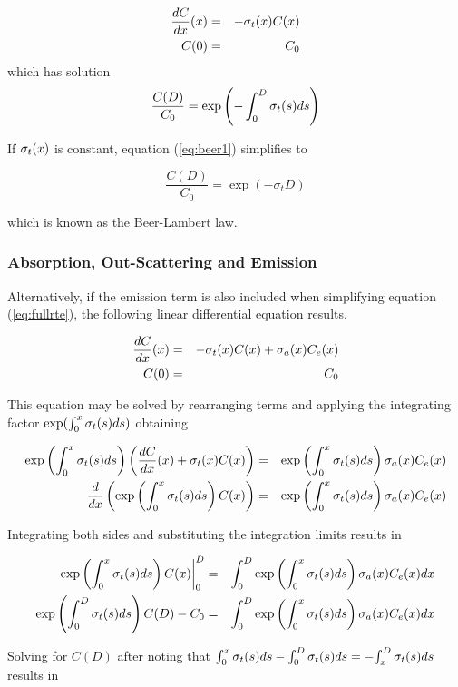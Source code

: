 \begin{eqnarray*}
\frac{dC}{dx}(x)&=&-\sigma_t(x) C(x)\\
C(0)&=&C_0
\end{eqnarray*}
which has solution
\begin{equation}
\label{eq:beer1} \frac{C(D)}{C_0}=\exp\left({-\int_0^D \sigma_t(s) ds}\right)
\end{equation}

If $\sigma_t(x)$ is constant, equation (\ref{eq:beer1}) simplifies to

\begin{equation}
\label{eq:beer2} \frac{C(D)}{C_0}=\exp(-\sigma_t D)
\end{equation}

which is known as the Beer-Lambert law\cite{Siegel:2001}.

%
%

\subsubsection{Absorption, Out-Scattering and Emission}

Alternatively, if the emission term is also included when simplifying equation (\ref{eq:fullrte}),  the following linear differential equation results.

\begin{eqnarray}
\label{eq:simple_rte}
\frac{dC}{dx}(x)&=&-\sigma_t(x) C(x) + \sigma_a(x) C_e(x)\\
 C(0)&=&C_0\nonumber
\end{eqnarray}

This equation may be solved by rearranging terms and applying the integrating factor $\exp(\int_0^x \sigma_t(s) ds)$ obtaining

\begin{eqnarray*}
\exp\left({\int_0^x \sigma_t(s) ds}\right)\left(\frac{dC}{dx}(x)+\sigma_t(x) C(x)\right)&=&  \exp\left({\int_0^x \sigma_t(s) ds}\right)\sigma_a(x) C_e(x)\\
\frac{d}{dx}\left(\exp\left({\int_0^x \sigma_t(s) ds}\right) C(x)\right)&=& \exp\left({\int_0^x \sigma_t(s) ds}\right)\sigma_a(x) C_e(x)
\end{eqnarray*}

Integrating both sides and substituting the integration limits results in

\begin{eqnarray*}
\left.\exp\left({\int_0^x \sigma_t(s) ds}\right) C(x)\right|_0^D&=& \int_0^D\exp\left({\int_0^x \sigma_t(s) ds}\right)\sigma_a(x) C_e(x) dx \\
\exp\left({\int_0^D \sigma_t(s) ds}\right) C(D)-C_0&=& \int_0^D\exp\left({\int_0^x \sigma_t(s) ds}\right)\sigma_a(x) C_e(x) dx
\end{eqnarray*}

Solving for $C(D)$ after noting that ${\int_0^x \sigma_t(s) ds}-{\int_0^D \sigma_t(s) ds}=-{\int_x^D \sigma_t(s) ds}$ results in

